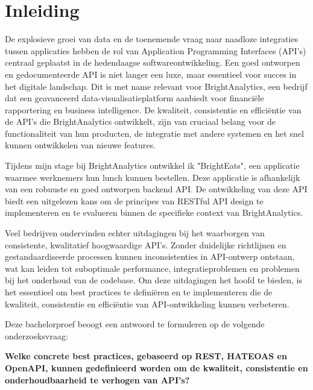 
\section{Inleiding}%
\label{sec:inleiding}
De explosieve groei van data en de toenemende vraag naar naadloze integraties tussen applicaties hebben de rol van Application Programming Interfaces (API's) centraal geplaatst in de hedendaagse softwareontwikkeling. Een goed ontworpen en gedocumenteerde API is niet langer een luxe, maar essentieel voor succes in het digitale landschap. Dit is met name relevant voor BrightAnalytics, een bedrijf dat een geavanceerd data-visualisatieplatform aanbiedt voor financiële rapportering en business intelligence. De kwaliteit, consistentie en efficiëntie van de API's die BrightAnalytics ontwikkelt, zijn van cruciaal belang voor de functionaliteit van hun producten, de integratie met andere systemen en het snel kunnen ontwikkelen van nieuwe features.

\bigskip

Tijdens mijn stage bij BrightAnalytics ontwikkel ik "BrightEats", een applicatie waarmee werknemers hun lunch kunnen bestellen. Deze applicatie is afhankelijk van een robuuste en goed ontworpen backend API. De ontwikkeling van deze API biedt een uitgelezen kans om de principes van RESTful API design te implementeren en te evalueren binnen de specifieke context van BrightAnalytics.

\bigskip

Veel bedrijven ondervinden echter uitdagingen bij het waarborgen van consistente, kwalitatief hoogwaardige API's. Zonder duidelijke richtlijnen en gestandaardiseerde processen kunnen inconsistenties in API-ontwerp ontstaan, wat kan leiden tot suboptimale performance, integratieproblemen en problemen bij het onderhoud van de codebase. Om deze uitdagingen het hoofd te bieden, is het essentieel om best practices te definiëren en te implementeren die de kwaliteit, consistentie en efficiëntie van API-ontwikkeling kunnen verbeteren.

\bigskip

Deze bachelorproef beoogt een antwoord te formuleren op de volgende onderzoeksvraag:

\begin{center}
\textbf{Welke concrete best practices, gebaseerd op REST, HATEOAS en OpenAPI, kunnen gedefinieerd worden om de kwaliteit, consistentie en onderhoudbaarheid te verhogen van API's?}
\end{center}

